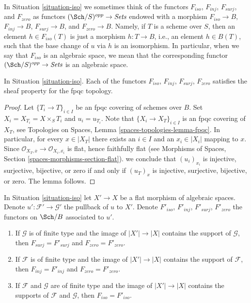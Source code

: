 \noindent
In Situation \ref{situation-iso} we sometimes think of the functors
$F_{iso}$, $F_{inj}$, $F_{surj}$, and $F_{zero}$ as functors
$(\Sch/S)^{opp} \to \textit{Sets}$ endowed with a morphism
$F_{iso} \to B$, $F_{inj} \to B$, $F_{surj} \to B$, and $F_{zero} \to B$.
Namely, if $T$ is a scheme over $S$, then an element $h \in F_{iso}(T)$
is just a morphism $h : T \to B$, i.e., an element $h \in B(T)$,
such that the base change of $u$ via $h$ is an isomorphism.
In particular, when we say
that $F_{iso}$ is an algebraic space, we mean that the corresponding
functor $(\Sch/S)^{opp} \to \textit{Sets}$ is an algebraic space.

\begin{lemma}
\label{lemma-iso-sheaf}
In Situation \ref{situation-iso}.
Each of the functors $F_{iso}$, $F_{inj}$, $F_{surj}$, $F_{zero}$
satisfies the sheaf property for the fpqc topology.
\end{lemma}

\begin{proof}
Let $\{T_i \to T\}_{i \in I}$ be an fpqc covering of schemes over $B$.
Set $X_i = X_{T_i} = X \times_S T_i$ and $u_i = u_{T_i}$.
Note that $\{X_i \to X_T\}_{i \in I}$ is an fpqc covering of $X_T$, see
Topologies on Spaces, Lemma \ref{spaces-topologies-lemma-fpqc}.
In particular, for every $x \in |X_T|$ there exists an $i \in I$
and an $x_i \in |X_i|$ mapping to $x$. Since
$\mathcal{O}_{X_T, \overline{x}} \to \mathcal{O}_{X_i, \overline{x_i}}$
is flat, hence faithfully flat (see
Morphisms of Spaces, Section \ref{spaces-morphisms-section-flat}).
we conclude that $(u_i)_{x_i}$ is injective, surjective, bijective, or zero
if and only if $(u_T)_x$ is injective, surjective, bijective, or zero.
The lemma follows.
\end{proof}

\begin{lemma}
\label{lemma-iso-go-up}
In Situation \ref{situation-iso} let $X' \to X$ be a flat morphism
of algebraic spaces. Denote $u' : \mathcal{F}' \to \mathcal{G}'$
the pullback of $u$ to $X'$. Denote $F'_{iso}$, $F'_{inj}$, $F'_{surj}$,
$F'_{zero}$ the functors on $\Sch/B$ associated to $u'$.
\begin{enumerate}
\item If $\mathcal{G}$ is of finite type and the image of $|X'| \to |X|$
contains the support of $\mathcal{G}$, then $F_{surj} = F'_{surj}$
and $F_{zero} = F'_{zero}$.
\item If $\mathcal{F}$ is of finite type and the image of $|X'| \to |X|$
contains the support of $\mathcal{F}$, then $F_{inj} = F'_{inj}$
and $F_{zero} = F'_{zero}$.
\item If $\mathcal{F}$ and $\mathcal{G}$ are of finite type and the image of
$|X'| \to |X|$ contains the supports of $\mathcal{F}$ and $\mathcal{G}$,
then $F_{iso} = F'_{iso}$.
\end{enumerate}
\end{lemma}

